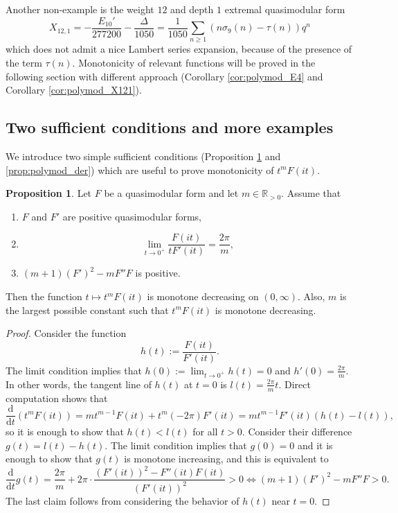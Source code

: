 \documentclass[10pt,reqno]{amsproc}
\newcommand{\dd}{\mathrm{d}}
\newcommand{\bR}{\mathbb{R}}
\newcommand{\1}{\mathds{1}}	%
\theoremstyle{definition}
\newtheorem{proposition}[theorem]{Proposition}
\theoremstyle{remark}
\begin{document}
Another non-example is the weight $12$ and depth $1$ extremal quasimodular form
\[
X_{12, 1} = - \frac{E_{10}'}{277200} - \frac{\Delta}{1050} = \frac{1}{1050} \sum_{n \ge 1} (n \sigma_9(n) - \tau(n)) q^n
\]
which does not admit a nice Lambert series expansion, because of the presence of the term $\tau(n)$.
Monotonicity of relevant functions will be proved in the following section with different approach (Corollary \ref{cor:polymod_E4} and Corollary \ref{cor:polymod_X121}).


\subsection{Two sufficient conditions and more examples}
\label{subsec:mono_qmfineq}

We introduce two simple sufficient conditions (Proposition \ref{prop:polymod_tangent} and \ref{prop:polymod_der}) which are useful to prove monotonicity of $t^m F(it)$.

\begin{proposition}
    \label{prop:polymod_tangent}
    Let $F$ be a quasimodular form and let $m \in \bR_{> 0}$.
    Assume that
    \begin{enumerate}
        \item $F$ and $F'$ are positive quasimodular forms,
        \item
        \[
        \lim_{t \to 0^+} \frac{F(it)}{t F'(it)} = \frac{2\pi}{m},
        \]
        \item $(m+1) (F')^2 - m F'' F$ is positive.
    \end{enumerate}
    Then the function $t \mapsto t^m F(it)$ is monotone decreasing on $(0, \infty)$.
    Also, $m$ is the largest possible constant such that $t^m F(it)$ is monotone decreasing.
\end{proposition}
\begin{proof}
    Consider the function
    \[
    h(t) := \frac{F(it)}{F'(it)}.
    \]
    The limit condition implies that $h(0) := \lim_{t \to 0^+} h(t) = 0$ and $h'(0) = \frac{2\pi}{m}$.
    In other words, the tangent line of $h(t)$ at $t = 0$ is $l(t) = \frac{2\pi}{m} t$.
    Direct computation shows that
    \[
    \frac{\dd}{\dd t}(t^m F(it)) = m t^{m-1} F(it) + t^m (-2\pi) F'(it) = m t^{m-1} F'(it) \left(h(t) - l(t)\right),
    \]
    so it is enough to show that $h(t) < l(t)$ for all $t > 0$.
    Consider their difference $g(t) = l(t) - h(t)$.
    The limit condition implies that $g(0) = 0$ and it is enough to show that $g(t)$ is monotone increasing, and this is equivalent to
    \[
    \frac{\dd}{\dd t} g(t) = \frac{2\pi}{m} + 2\pi \cdot \frac{(F'(it))^2 - F''(it) F(it)}{(F'(it))^2} > 0 \Leftrightarrow (m+1) (F')^2 - m F'' F > 0.
    \]
    The last claim follows from considering the behavior of $h(t)$ near $t = 0$.
\end{proof}
\end{document}
